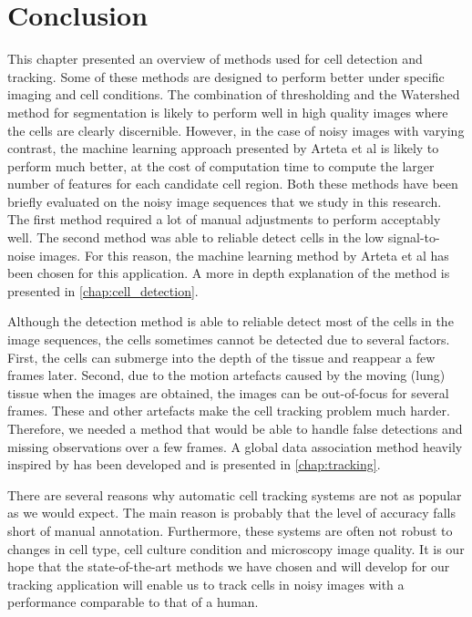 \section{Conclusion \statusfirstdraft}
\label{sec:conclusionmethods}
This chapter presented an overview of methods used for cell detection and tracking. Some of these methods are designed to perform better under specific imaging and cell conditions. The combination of thresholding and the Watershed method for segmentation is likely to perform well in high quality images where the cells are clearly discernible. However, in the case of noisy images with varying contrast, the machine learning approach presented by Arteta et al is likely to perform much better, at the cost of computation time to compute the larger number of features for each candidate cell region. Both these methods have been briefly evaluated on the noisy image sequences that we study in this research. The first method required a lot of manual adjustments to perform acceptably well. The second method was able to reliable detect cells in the low signal-to-noise images. For this reason, the machine learning method by Arteta et al has been chosen for this application. A more in depth explanation of the method is presented in \cref{chap:cell_detection}.

Although the detection method is able to reliable detect most of the cells in the image sequences, the cells sometimes cannot be detected due to several factors. First, the cells can submerge into the depth of the tissue and reappear a few frames later. Second, due to the motion artefacts caused by the moving (lung) tissue when the images are obtained, the images can be out-of-focus for several frames. These and other artefacts make the cell tracking problem much harder. Therefore, we needed a method that would be able to handle false detections and missing observations over a few frames. A global data association method heavily inspired by \cite{bise11global} has been developed and is presented in \cref{chap:tracking}.

There are several reasons why automatic cell tracking systems are not as popular as we would expect. The main reason is probably that the level of accuracy falls short of manual annotation. Furthermore, these systems are often not robust to changes in cell type, cell culture condition and microscopy image quality. It is our hope that the state-of-the-art methods we have chosen and will develop for our tracking application will enable us to track cells in noisy images with a performance comparable to that of a human.